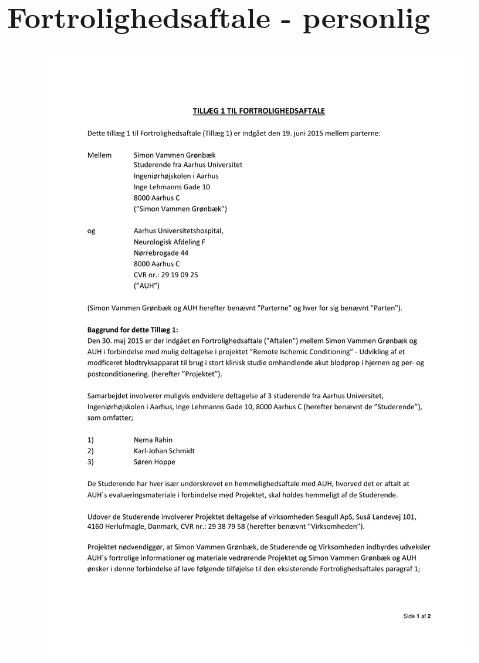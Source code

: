 \section{Fortrolighedsaftale - personlig} \label{app:tavshedserkl_personlig}
\begin{figure}[H]
	\includegraphics[width = 1\textwidth]{billeder/FortrolighedsaftalePersonligSide1.pdf}
\end{figure}
\newpage
